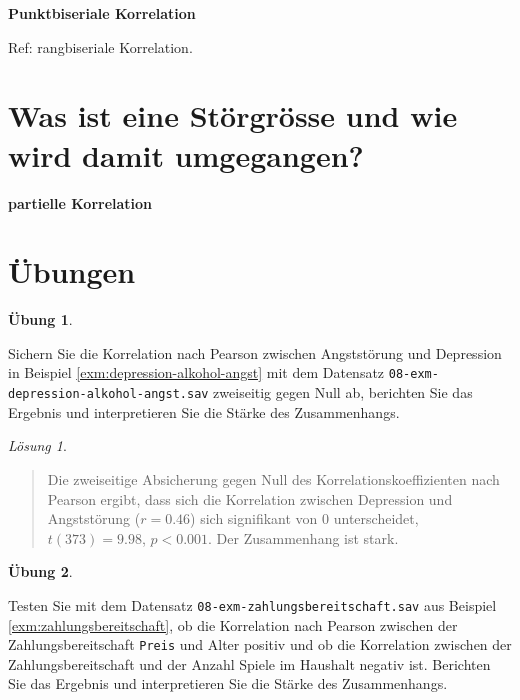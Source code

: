\documentclass[
]{book}
\theoremstyle{definition}
\theoremstyle{definition}
\theoremstyle{definition}
\newtheorem{exercise}{Übung}[chapter]
\theoremstyle{definition}
\theoremstyle{remark}
\newtheorem*{solution}{Lösung}
\begin{document}
\label{customdef-punktbiseriale-korrelation}{\textbf{Punktbiseriale Korrelation}}

Ref: rangbiseriale Korrelation.

\section{Was ist eine Störgrösse und wie wird damit umgegangen?}\label{stoergroesse}

\label{customdef-partielle-korrelation}{\textbf{partielle Korrelation}}

\section{Übungen}\label{uxfcbungen-5}

\begin{exercise}
\protect\hypertarget{exr:depression-alkohol-angst-berichten}{}\label{exr:depression-alkohol-angst-berichten}\leavevmode

Sichern Sie die Korrelation nach Pearson zwischen Angststörung und Depression in Beispiel \ref{exm:depression-alkohol-angst} mit dem Datensatz \texttt{08-exm-depression-alkohol-angst.sav} zweiseitig gegen Null ab, berichten Sie das Ergebnis und interpretieren Sie die Stärke des Zusammenhangs.

\end{exercise}

\begin{solution}
\leavevmode

\begin{quote}
Die zweiseitige Absicherung gegen Null des Korrelationskoeffizienten nach Pearson ergibt, dass sich die Korrelation zwischen Depression und Angststörung (\(r = 0.46\)) sich signifikant von \(0\) unterscheidet, \(t(373) = 9.98\), \(p < 0.001\). Der Zusammenhang ist stark.
\end{quote}

\end{solution}

\begin{exercise}
\protect\hypertarget{exr:zahlungsbereitschaft-berichten}{}\label{exr:zahlungsbereitschaft-berichten}\leavevmode

Testen Sie mit dem Datensatz \texttt{08-exm-zahlungsbereitschaft.sav} aus Beispiel \ref{exm:zahlungsbereitschaft}, ob die Korrelation nach Pearson zwischen der Zahlungsbereitschaft \texttt{Preis} und Alter positiv und ob die Korrelation zwischen der Zahlungsbereitschaft und der Anzahl Spiele im Haushalt negativ ist. Berichten Sie das Ergebnis und interpretieren Sie die Stärke des Zusammenhangs.

\end{exercise}
\end{document}
